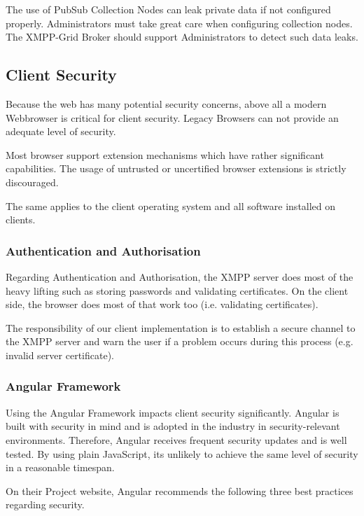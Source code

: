 The use of PubSub Collection Nodes \cite{xep-0248} can leak private data if not configured properly.
Administrators must take great care when configuring collection nodes.
The XMPP-Grid Broker should support Administrators to detect such data leaks.

\subsection{Client Security}

Because the web has many potential security concerns, above all a modern Webbrowser is critical for client security.
Legacy Browsers can not provide an adequate level of security.

Most browser support extension mechanisms which have rather significant capabilities.
The usage of untrusted or uncertified browser extensions is strictly discouraged.

The same applies to the client operating system and all software installed on clients.

\subsubsection{Authentication and Authorisation}

Regarding Authentication and Authorisation, the XMPP server does most of the heavy lifting such as storing passwords and validating certificates.
On the client side, the browser does most of that work too (i.e. validating certificates).

The responsibility of our client implementation is to establish a secure channel to the XMPP server and warn the user if a problem occurs during this process (e.g. invalid server certificate).

\subsubsection{Angular Framework}

Using the Angular Framework impacts client security significantly.
Angular is built with security in mind and is adopted in the industry in security-relevant environments.
Therefore, Angular receives frequent security updates and is well tested.
By using plain JavaScript, its unlikely to achieve the same level of security in a reasonable timespan.

On their Project website, Angular recommends the following three best practices regarding security. \cite{angular-security}

